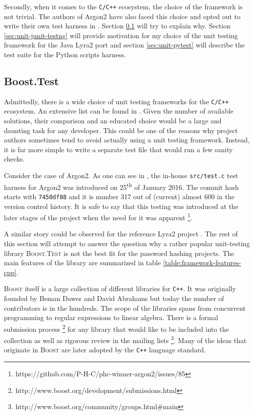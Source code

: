 Secondly, when it comes to the \texttt{C/C++} ecosystem, the choice of the framework is not trivial. The authors of Argon2 have also faced this choice and opted out to write their own test harness in \cite{github:2017:argon2-test.c}. Section \ref{sec:unit-boost-google} will try to explain why. Section \ref{sec:unit-junit-testng} will provide motivation for my choice of the unit testing framework for the Java Lyra2 port and section \ref{sec:unit-pytest} will describe the test suite for the Python scripts harness.

\subsection{Boost.Test}
\label{sec:unit-boost-google}

Admittedly, there is a wide choice of unit testing frameworks for the \texttt{C/C++} ecosystem. An extensive list can be found in \cite{wiki:2017:frameworks-c, wiki:2017:frameworks-cpp}. Given the number of available solutions, their comparison and an educated choice would be a large and daunting task for any developer. This could be one of the reasons why project authors sometimes tend to avoid actually using a unit testing framework. Instead, it is far more simple to write a separate test file that would run a few sanity checks.

Consider the case of Argon2. As one can see in \cite{github:2017:argon2}, the in-house \texttt{src/test.c} test harness for Argon2 was introduced on 25\textsuperscript{th} of January 2016. The commit hash starts with \texttt{7450df88} and it is number 317 out of (current) almost 600 in the version control history. It is safe to say that this testing was introduced at the later stages of the project when the need for it was apparent \footnote{https://github.com/P-H-C/phc-winner-argon2/issues/85}.

A similar story could be observed for the reference Lyra2 project \cite{github:2017:lyra}. The rest of this section will attempt to answer the question why a rather popular unit-testing library \textsc{Boost.Test} is not the best fit for the password hashing projects. The main features of the library are summarized in table \ref{table:framework-features-cpp}.

\textsc{Boost} itself is a large collection of different libraries for \texttt{C++}. It was originally founded by Beman Dawes and David Abrahams but today the number of contributors is in the hundreds. The scope of the libraries spans from concurrent programming to regular expressions to linear algebra. There is a formal submission process \footnote{http://www.boost.org/development/submissions.html} for any library that would like to be included into the collection as well as rigorous review in the mailing lists \footnote{http://www.boost.org/community/groups.html\#main}. Many of the ideas that originate in \textsc{Boost} are later adopted by the \texttt{C++} language standard.

